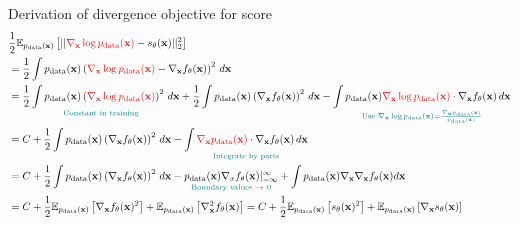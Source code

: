 \documentclass[handout, aspectratio=169,xcolor=dvipsnames]{beamer}
\newcommand{\bx}{\mathbf{x}}
\newcommand{\nbx}{\nabla_{\bx}}
\begin{document}




\begin{frame}{Derivation of divergence objective for score}
  \small
  \begin{align*}
    &\frac{1}{2}\mathbb{E}_{p_\text{data}(\bx)} \left[ || \textcolor{red}{\nbx \log p_\text{data}(\bx)} - s_\theta(\bx) ||_2^2\right]\\
    &= \frac{1}{2} \int p_\text{data}(\bx) \left(\textcolor{red}{\nbx \log p_\text{data}(\bx)} - \nbx f_\theta(\bx) \right)^2 \,d\bx\\
    &= \underset{\textcolor{teal}{{\text{Constant in training}}}}{\frac{1}{2} \int p_\text{data}(\bx) \left(\textcolor{red}{\nbx \log p_\text{data}(\bx)}\right)^2 \,d\bx
    }+ \frac{1}{2} \int p_\text{data}(\bx) \left(\nbx f_\theta(\bx) \right)^2 \,d\bx - \underset{
    \textcolor{teal}{\text{Use }\nbx \log p_\text{data}(\bx) = \frac{\nbx p_\text{data}(\bx)}{p_\text{data}(\bx)}}  
    }
    {\int p_\text{data}(\bx) \textcolor{red}{\nbx \log p_\text{data}(\bx)} \cdot \nbx f_\theta(\bx) \,d\bx}\\
    &= C + \frac{1}{2} \int p_\text{data}(\bx) \left(\nbx f_\theta(\bx) \right)^2 \,d\bx - \underset{\textcolor{teal}{\text{Integrate by parts}}}{\int \textcolor{red}{\nbx p_\text{data}(\bx)}  \cdot \nbx f_\theta (\bx) \,d \bx}\\
    &=  C + \frac{1}{2} \int p_\text{data}(\bx) \left(\nbx f_\theta(\bx) \right)^2 \,d\bx - \underset{\textcolor{teal}{\text{Boundary values } \to~ 0}}{p_\text{data}(\bx) \nabla_x f_\theta(\bx)|_{-\infty}^{\infty}}  + \int p_\text{data}(\bx) \nbx \nbx f_\theta(\bx) d \bx\\
    &= C + \frac{1}{2} \mathbb{E}_{p_\text{data}(\bx)} \left[\nbx f_\theta(\bx)^2\right] +\mathbb{E}_{p_\text{data}(\bx)} \left[ \nbx^2 f_\theta(\bx)\right] = C + \frac{1}{2}\mathbb{E}_{p_\text{data}(\bx)} \left[ s_\theta(\bx)^2\right] + \mathbb{E}_{p_\text{data}(\bx)}\left[\nbx s_\theta(\bx) \right]
  \end{align*}
\end{frame}
\end{document}
